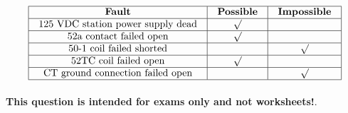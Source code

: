 






$$\vbox{\offinterlineskip
\halign{\strut
\vrule \quad\hfil # \ \hfil & 
\vrule \quad\hfil # \ \hfil & 
\vrule \quad\hfil # \ \hfil \vrule \cr
\noalign{\hrule}
%
{\bf Fault} & {\bf Possible} & {\bf Impossible} \cr
%
\noalign{\hrule}
%
125 VDC station power supply dead & $\surd$ &  \cr
%
\noalign{\hrule}
%
52a contact failed open & $\surd$ &  \cr
%
\noalign{\hrule}
%
50-1 coil failed shorted &  & $\surd$ \cr
%
\noalign{\hrule}
%
52TC coil failed open & $\surd$ &  \cr
%
\noalign{\hrule}
%
CT ground connection failed open &  & $\surd$ \cr
%
\noalign{\hrule}
} %
}$$ %







{\bf This question is intended for exams only and not worksheets!}.



